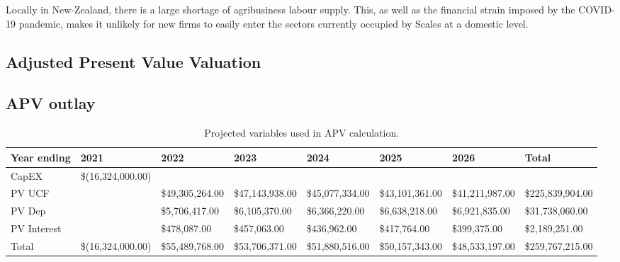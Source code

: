 \documentclass{article}
\begin{document}
Locally in New-Zealand, there is a large shortage of agribusiness labour supply. This, as well as the financial strain imposed by the COVID-19 pandemic, makes it unlikely for new firms to easily enter the sectors currently occupied by Scales at a domestic level.

\newpage
\begin{landscape}
\section{Adjusted Present Value Valuation}
\subsection{APV outlay}

\begin{table}[h]
\begin{tabular}{|l|l|l|l|l|l|l|l|}
\hline
Year ending & {\color[HTML]{FF0000} 2021} & {\color[HTML]{FF0000} 2022} & {\color[HTML]{FF0000} 2023} & {\color[HTML]{FF0000} 2024} & {\color[HTML]{FF0000} 2025} & {\color[HTML]{FF0000} 2026} & Total                                   \\ \hline
CapEX       & \$(16,324,000.00)           &                             &                             &                             &                             &                             &                                         \\ \hline
PV UCF      &                             & \$49,305,264.00             & \$47,143,938.00             & \$45,077,334.00             & \$43,101,361.00             & \$41,211,987.00             & \$225,839,904.00                        \\ \hline
PV Dep      &                             & \$5,706,417.00              & \$6,105,370.00              & \$6,366,220.00              & \$6,638,218.00              & \$6,921,835.00              & \$31,738,060.00                         \\ \hline
PV Interest &                             & \$478,087.00                & \$457,063.00                & \$436,962.00                & \$417,764.00                & \$399,375.00                & \$2,189,251.00                          \\ \hline
Total       & \$(16,324,000.00)           & \$55,489,768.00             & \$53,706,371.00             & \$51,880,516.00             & \$50,157,343.00             & \$48,533,197.00             & {\color[HTML]{FF0000} \$259,767,215.00} \\ \hline
\end{tabular}
\caption{Projected variables used in APV calculation.}
\label{tab:APV_calc}
\end{table}


\end{landscape}
\end{document}
